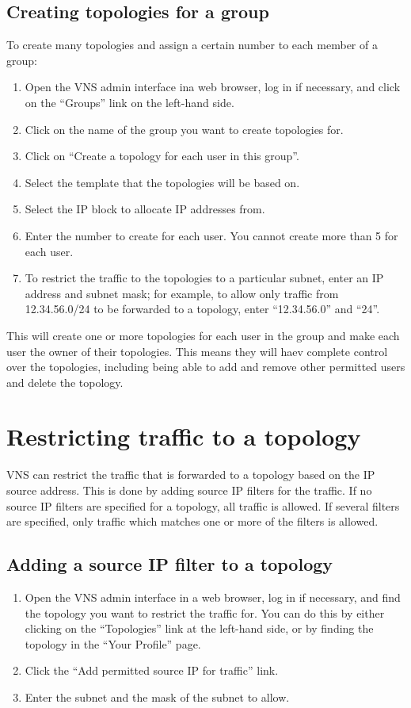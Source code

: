 \documentclass[a4paper,12pt]{report}
\begin{document}
\subsection{Creating topologies for a group}
To create many topologies and assign a certain number to each member of a group:
\begin{enumerate}
\item Open the VNS admin interface ina web browser, log in if necessary, and click on the ``Groups'' link on the left-hand side.
\item Click on the name of the group you want to create topologies for.
\item Click on ``Create a topology for each user in this group''.
\item Select the template that the topologies will be based on.
\item Select the IP block to allocate IP addresses from.
\item Enter the number to create for each user.  You cannot create more than 5 for each user.
\item To restrict the traffic to the topologies to a particular subnet, enter an IP address and subnet mask; for example, to allow only traffic from 12.34.56.0/24 to be forwarded to a topology, enter ``12.34.56.0'' and ``24''.
\end{enumerate}

This will create one or more topologies for each user in the group and make each user the owner of their topologies.  This means they will haev complete control over the topologies, including being able to add and remove other permitted users and delete the topology.

\section{Restricting traffic to a topology}
VNS can restrict the traffic that is forwarded to a topology based on the IP source address.  This is done by adding source IP filters for the traffic.  If no source IP filters are specified for a topology, all traffic is allowed.  If several filters are specified, only traffic which matches one or more of the filters is allowed.

\subsection{Adding a source IP filter to a topology}
\begin{enumerate}
\item Open the VNS admin interface in a web browser, log in if necessary, and find the topology you want to restrict the traffic for.  You can do this by either clicking on the ``Topologies'' link at the left-hand side, or by finding the topology in the ``Your Profile'' page.
\item Click the ``Add permitted source IP for traffic'' link.
\item Enter the subnet and the mask of the subnet to allow.
\end{enumerate}
\end{document}
